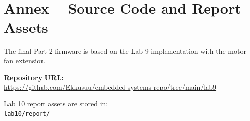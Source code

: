 \documentclass[12pt]{article}
\begin{document}
\FloatBarrier
\section*{Annex -- Source Code and Report Assets}

The final Part 2 firmware is based on the Lab 9 implementation with the motor fan extension.

\bigskip
\noindent\textbf{Repository URL:}\\
\url{https://github.com/Ekkusuu/embedded-systems-repo/tree/main/lab9}

\bigskip
\noindent Lab 10 report assets are stored in:\\
\texttt{lab10/report/}
\end{document}
